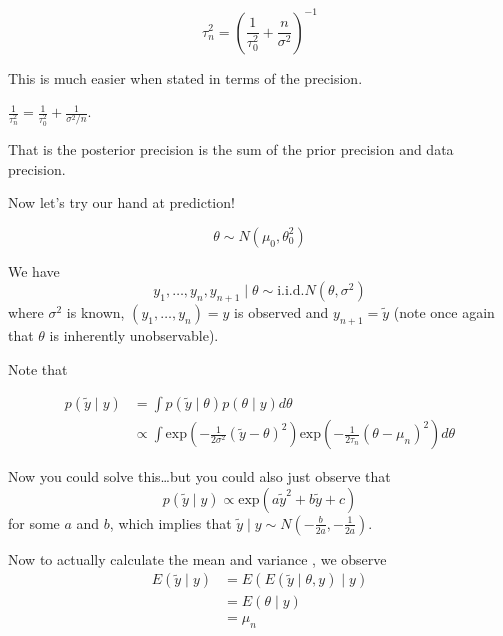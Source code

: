 \documentclass[a4paper]{article}
\begin{document}
\begin{equation}
	\tau _n ^2 = \left( \frac{1}{\tau _0 ^2} + \frac{n}{\sigma ^2} \right) ^{-1}
\end{equation}

This is much easier when stated in terms of the precision.

$\frac{1}{\tau _n ^2} = \frac{1}{\tau _0 ^2} + \frac{1}{\sigma ^2 / n}$.

That is the posterior precision is the sum of the prior precision and data precision.

Now let's try our hand at prediction!

\begin{equation}
	\theta \sim N\left( \mu _0, \theta _0 ^2 \right)
\end{equation}

We have 
\begin{equation}
	y_1 , \ldots, y_n, y_{n + 1} \mid \theta \sim \text{i.i.d.} N\left( \theta, \sigma ^2 \right)
\end{equation}
where $\sigma ^2$ is known, $\left( y_1, \ldots, y_n \right) = y$ is observed and $y_{n + 1} = \tilde{y}$ (note once again that $\theta$ is inherently unobservable).

Note that

\begin{align}
	p\left( \tilde{y} \mid y \right) &= \int p\left( \tilde{y} \mid \theta \right) p\left( \theta \mid y \right) d \theta \\
	&\propto \int \text{exp}\left( -\frac{1}{2 \sigma ^2} \left( \tilde{y} - \theta \right) ^2 \right)\text{exp}\left( -\frac{1}{2 \tau _n} \left( \theta - \mu _n \right) ^2 \right) d\theta
\end{align}

Now you could solve this\dots but you could also just observe that
\begin{equation}
	p\left( \tilde{y} \mid y \right) \propto \text{exp}\left( a \tilde{y}^2 + b \tilde{y} + c \right)
\end{equation}
for some $a$ and $b$, which implies that $\tilde{y} \mid y \sim N\left(
-\frac{b}{2a}, -\frac{1}{2a} \right)$.

Now to actually calculate the mean and variance , we observe
\begin{align}
	E\left( \tilde{y} \mid y \right) &= E\left( E\left( \tilde{y} \mid \theta, y \right) \mid y \right) \\
	&= E\left( \theta \mid y \right) \\
	&= \mu _n
\end{align}
\end{document}

